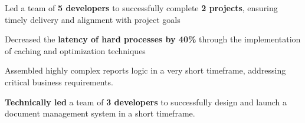 \begin{tightemize}
    \item Led a team of \textbf{5 developers} to successfully complete \textbf{2 projects}, ensuring timely delivery and alignment with project goals

    \item Decreased the \textbf{latency of hard processes by 40\%} through the implementation of caching and optimization techniques

    \item Assembled highly complex reports logic in a very short timeframe, addressing critical business requirements.

\end{tightemize}
\sectionsep


\begin{tightemize}
    \item \textbf{Technically led} a team of \textbf{3 developers} to successfully design and launch a document management system in a short timeframe.
\end{tightemize}
\sectionsep

\sectionsep

\sectionsep

\sectionsep